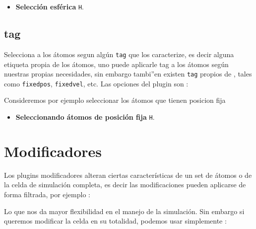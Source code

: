 \begin{itemize}
 \item \textbf{Selecci\'on esf\'erica} \texttt{H}.
\end{itemize}

\subsection{tag}
Selecciona a los \'atomos segun alg\'un \verb|tag| que los caracterize, es decir alguna etiqueta propia de los \'atomos, uno puede aplicarle tag a los \'atomos seg\'un nuestras propias necesidades, sin embargo tambi''en existen \verb|tag| propios de {\lpmd}, tales como \verb|fixedpos|, \verb|fixedvel|, etc. Las opciones del plugin son :


Consideremos por ejemplo seleccionar los \'atomos que tienen posicion fija

\begin{itemize}
 \item \textbf{Seleccionando \'atomos de posici\'on fija} \texttt{H}.
\end{itemize}

\section{Modificadores}

Los plugins modificadores alteran ciertas caracter\'isticas de un set de \'atomos o de la celda de simulaci\'on completa, es decir las modificaciones pueden aplicarse de forma filtrada, por ejemplo :


Lo que nos da mayor flexibilidad en el manejo de la simulaci\'on. Sin embargo si queremos modificar la celda en su totalidad, podemos usar simplemente :


